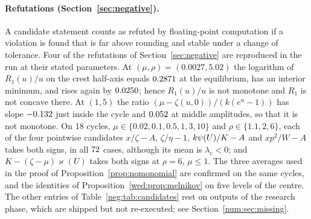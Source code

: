 \paragraph{Refutations (Section~\ref{sec:negative}).}
A candidate statement counts as refuted by floating-point computation if a violation is found that is far above rounding and stable under a change of tolerance. Four of the refutations of Section~\ref{sec:negative} are reproduced in the run at their stated parameters. At $(\mu,\rho)=(0.0027,5.02)$ the logarithm of $R_1(u)/u$ on the crest half-axis equals $0.2871$ at the equilibrium, has an interior minimum, and rises again by $0.0250$; hence $R_1(u)/u$ is not monotone and $R_1$ is not concave there. At $(1,5)$ the ratio $(\mu-\zeta(u,0))/(k(e^u-1))$ has slope $-0.132$ just inside the cycle and $0.052$ at middle amplitudes, so that it is not monotone. On 18 cycles, $\mu\in\{0.02,0.1,0.5,1,3,10\}$ and $\rho\in\{1.1,2,6\}$, each of the four pointwise candidates $x/\zeta-A$, $\zeta/\eta-1$, $k\psi(U)/K-A$ and $xp^2/W-A$ takes both signs, in all $72$ cases, although its mean is $\lambda_c<0$; and $K-(\zeta-\mu)\varkappa(U)$ takes both signs at $\rho=6$, $\mu\le1$. The three averages used in the proof of Proposition~\ref{prop:nomonomial} are confirmed on the same cycles, and the identities of Proposition~\ref{wed:prop:melnikov} on five levels of the centre. The other entries of Table~\ref{neg:tab:candidates} rest on outputs of the research phase, which are shipped but not re-executed; see Section~\ref{num:sec:missing}.

